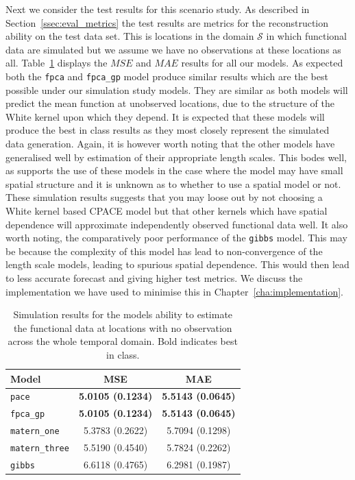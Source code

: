 Next we consider the test results for this scenario study.
As described in Section~\ref{ssec:eval_metrics} the test results are metrics for the reconstruction ability on the test data set.
This is locations in the domain $\mathcal{S}$ in which functional data are simulated but we assume we have no observations at these locations as all.
Table~\ref{tab:test_A} displays the $MSE$ and $MAE$ results for all our models.
As expected both the \verb*|fpca| and \verb*|fpca_gp| model produce similar results which are the best possible under our simulation study models.
They are similar as both models will predict the mean function at unobserved locations, due to the structure of the White kernel upon which they depend.
It is expected that these models will produce the best in class results as they most closely represent the simulated data generation. 
Again, it is however worth noting that the other models have generalised well by estimation of their appropriate length scales.
This bodes well, as supports the use of these models in the case where the model may have small spatial structure and it is unknown as to whether to use a spatial model or not.
These simulation results suggests that you may loose out by not choosing a White kernel based CPACE model but that other kernels which have spatial dependence will approximate independently observed functional data well.
It also worth noting, the comparatively poor performance of the \verb*|gibbs| model.
This may be because the complexity of this model has lead to non-convergence of the length scale models, leading to spurious spatial dependence.
This would then lead to less accurate forecast and giving higher test metrics. 
We discuss the implementation we have used to minimise this in Chapter~\ref{cha:implementation}.

\begin{table}
	\caption[Simulation results for Scenario A on test data]{Simulation results for the models ability to estimate the functional data at locations with no observation across the whole temporal domain. Bold indicates best in class.}
	\centering
	\label{tab:test_A}
	\begin{tabular}{lcc}
		\toprule
		\textbf{Model} & \textbf{MSE} & \textbf{MAE} \\
		\midrule
		\verb*|pace| & \textbf{5.0105 (0.1234)} & \textbf{5.5143 (0.0645)} \\
		\verb*|fpca_gp| & \textbf{5.0105 (0.1234)} & \textbf{5.5143 (0.0645)} \\
		\verb*|matern_one| & 5.3783	(0.2622) & 5.7094 (0.1298) \\
		\verb*|matern_three| & 5.5190 (0.4540) & 5.7824	(0.2262) \\
		\verb*|gibbs| & 6.6118 (0.4765) & 6.2981 (0.1987)\\
		\bottomrule
	\end{tabular}
\end{table}

